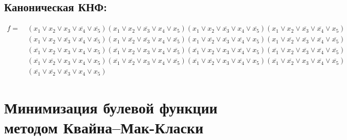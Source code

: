 \documentclass{article}
\begin{document}
\subsection*{Каноническая КНФ:}
\begin{align*}
f =\: &\left(x_{1} \lor x_{2} \lor x_{3} \lor \overline{x_{4}} \lor \overline{x_{5}}\right)\left(x_{1} \lor x_{2} \lor \overline{x_{3}} \lor x_{4} \lor x_{5}\right)\left(x_{1} \lor x_{2} \lor \overline{x_{3}} \lor x_{4} \lor \overline{x_{5}}\right)\left(x_{1} \lor x_{2} \lor \overline{x_{3}} \lor \overline{x_{4}} \lor x_{5}\right)\\&\left(x_{1} \lor x_{2} \lor \overline{x_{3}} \lor \overline{x_{4}} \lor \overline{x_{5}}\right)\left(x_{1} \lor \overline{x_{2}} \lor \overline{x_{3}} \lor x_{4} \lor \overline{x_{5}}\right)\left(x_{1} \lor \overline{x_{2}} \lor \overline{x_{3}} \lor \overline{x_{4}} \lor x_{5}\right)\left(x_{1} \lor \overline{x_{2}} \lor \overline{x_{3}} \lor \overline{x_{4}} \lor \overline{x_{5}}\right)\\&\left(\overline{x_{1}} \lor x_{2} \lor x_{3} \lor x_{4} \lor x_{5}\right)\left(\overline{x_{1}} \lor x_{2} \lor x_{3} \lor x_{4} \lor \overline{x_{5}}\right)\left(\overline{x_{1}} \lor x_{2} \lor x_{3} \lor \overline{x_{4}} \lor x_{5}\right)\left(\overline{x_{1}} \lor x_{2} \lor \overline{x_{3}} \lor \overline{x_{4}} \lor \overline{x_{5}}\right)\\&\left(\overline{x_{1}} \lor \overline{x_{2}} \lor x_{3} \lor x_{4} \lor x_{5}\right)\left(\overline{x_{1}} \lor \overline{x_{2}} \lor x_{3} \lor x_{4} \lor \overline{x_{5}}\right)\left(\overline{x_{1}} \lor \overline{x_{2}} \lor x_{3} \lor \overline{x_{4}} \lor x_{5}\right)\left(\overline{x_{1}} \lor \overline{x_{2}} \lor x_{3} \lor \overline{x_{4}} \lor \overline{x_{5}}\right)\\&\left(\overline{x_{1}} \lor \overline{x_{2}} \lor \overline{x_{3}} \lor x_{4} \lor x_{5}\right)\end{align*}
\section*{Минимизация булевой функции методом Квайна--Мак-Класки}
\end{document}
